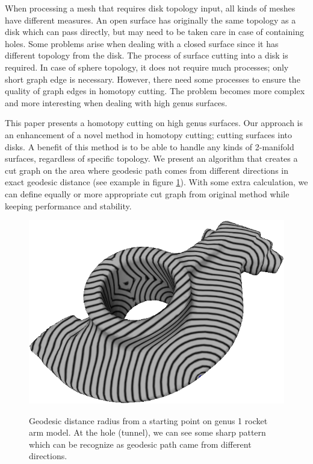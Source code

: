 \documentclass[a4paper,twoside]{article}
\begin{document}
When processing a mesh that requires disk topology input, all kinds of meshes have different measures. An open surface has originally the same topology as a disk which can pass directly, but may need to be taken care in case of containing holes. Some problems arise when dealing with a closed surface since it has different topology from the disk. The process of surface cutting into a disk is required. In case of sphere topology, it does not require much processes; only short graph edge is necessary. However, there need some processes to ensure the quality of graph edges in homotopy cutting. The problem becomes more complex and more interesting when dealing with high genus surfaces. 
   
This paper presents a homotopy cutting on high genus surfaces. Our approach is an enhancement of a novel method \cite{Gu:2002:GI:566654.566589} in homotopy cutting; cutting surfaces into disks. A benefit of this method is to be able to handle any kinds of 2-manifold surfaces, regardless of specific topology. We present an algorithm that creates a cut graph on the area where geodesic path comes from different directions in exact geodesic distance \cite{Mitchell:1987:DGP:33367.33372,Surazhsky:2005:FEA:1073204.1073228} (see example in figure \ref{fig:geodesic rocket arm}). With some extra calculation,  we can define equally or more appropriate cut graph from original method while keeping performance and stability.
\begin{figure}[!h]
	\centering
	{\includegraphics[width=0.9\columnwidth]{images/geodesic_rocket-arm.png}}
	\caption{Geodesic distance radius from a starting point on genus 1 rocket arm model. At the hole (tunnel), we can see some sharp pattern which can be recognize as geodesic path came from different directions.}
	\label{fig:geodesic rocket arm}
\end{figure}
\end{document}
